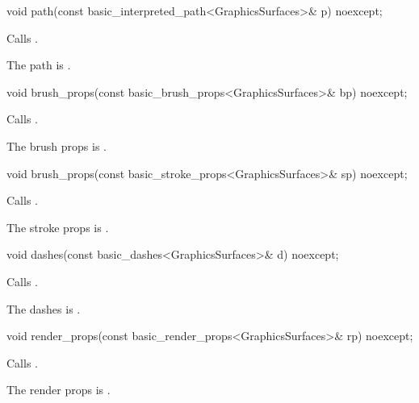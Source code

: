 %
\begin{itemdecl}
void path(const basic_interpreted_path<GraphicsSurfaces>& p) noexcept;
\end{itemdecl}
\begin{itemdescr}
\pnum
\effects Calls .

\pnum
\remarks The path is .
\end{itemdescr}

%
\begin{itemdecl}
void brush_props(const basic_brush_props<GraphicsSurfaces>& bp) noexcept;
\end{itemdecl}
\begin{itemdescr}
\pnum
\effects Calls .

\pnum
\remarks The brush props is .
\end{itemdescr}

%
\begin{itemdecl}
void brush_props(const basic_stroke_props<GraphicsSurfaces>& sp) noexcept;
\end{itemdecl}
\begin{itemdescr}
\pnum
\effects Calls .

\pnum
\remarks The stroke props is .
\end{itemdescr}

%
\begin{itemdecl}
void dashes(const basic_dashes<GraphicsSurfaces>& d) noexcept;
\end{itemdecl}
\begin{itemdescr}
\pnum
\effects Calls .

\pnum
\remarks The dashes is .
\end{itemdescr}

%
\begin{itemdecl}
void render_props(const basic_render_props<GraphicsSurfaces>& rp) noexcept;
\end{itemdecl}
\begin{itemdescr}
\pnum
\effects Calls .

\pnum
\remarks The render props is .
\end{itemdescr}


